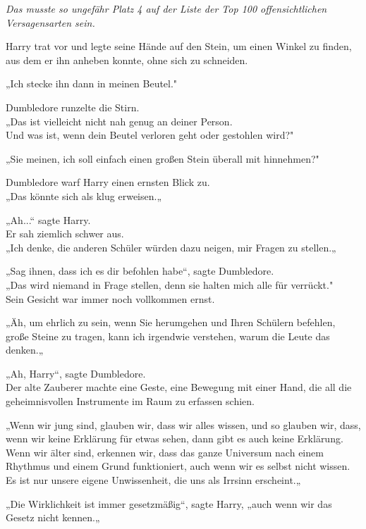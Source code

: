 {\emph{Das musste so ungefähr Platz 4 auf der Liste der Top 100 offensichtlichen Versagensarten sein.}

Harry trat vor und legte seine Hände auf den Stein, um einen Winkel zu finden, aus dem er ihn anheben konnte, ohne sich zu schneiden.

„Ich stecke ihn dann in meinen Beutel."

Dumbledore runzelte die Stirn.\\ „Das ist vielleicht nicht nah genug an deiner Person.\\ Und was ist, wenn dein Beutel verloren geht oder gestohlen wird?"

„Sie meinen, ich soll einfach einen großen Stein überall mit hinnehmen?"

Dumbledore warf Harry einen ernsten Blick zu.\\ „Das könnte sich als klug erweisen.„

„Ah...“ sagte Harry.\\ Er sah ziemlich schwer aus.\\ „Ich denke, die anderen Schüler würden dazu neigen, mir Fragen zu stellen.„

„Sag ihnen, dass ich es dir befohlen habe“, sagte Dumbledore.\\ „Das wird niemand in Frage stellen, denn sie halten mich alle für verrückt."\\ Sein Gesicht war immer noch vollkommen ernst.

„Äh, um ehrlich zu sein, wenn Sie herumgehen und Ihren Schülern befehlen, große Steine zu tragen, kann ich irgendwie verstehen, warum die Leute das denken.„

„Ah, Harry“, sagte Dumbledore.\\ Der alte Zauberer machte eine Geste, eine Bewegung mit einer Hand, die all die geheimnisvollen Instrumente im Raum zu erfassen schien.

„Wenn wir jung sind, glauben wir, dass wir alles wissen, und so glauben wir, dass, wenn wir keine Erklärung für etwas sehen, dann gibt es auch keine Erklärung.\\ Wenn wir älter sind, erkennen wir, dass das ganze Universum nach einem Rhythmus und einem Grund funktioniert, auch wenn wir es selbst nicht wissen.\\ Es ist nur unsere eigene Unwissenheit, die uns als Irrsinn erscheint.„

„Die Wirklichkeit ist immer gesetzmäßig“, sagte Harry, „auch wenn wir das Gesetz nicht kennen.„

}
